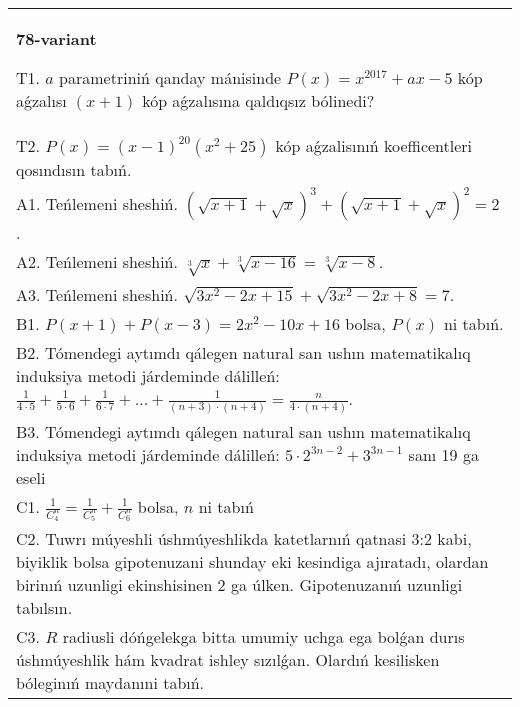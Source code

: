\documentclass{article}
\begin{document}
\begin{tabular}{m{17cm}}
\textbf{78-variant}
\newline

T1. \(a\) parametriniń qanday mánisinde \(P(x) = x^{2017} + ax - 5\) kóp aǵzalısı \((x + 1)\) kóp aǵzalısına qaldıqsız bólinedi? \\
T2. \(P(x) = (x - 1)^{20}\left( x^{2} + 25 \right)\) kóp aǵzalisınıń koefficentleri qosındısın tabıń. \\
A1. Teńlemeni sheshiń. \((\sqrt{x + 1} + \sqrt{x})^{3} + (\sqrt{x + 1} + \sqrt{x})^{2} = 2\). \\
A2. Teńlemeni sheshiń. \(\sqrt[3]{x} + \sqrt[3]{x - 16} = \sqrt[3]{x - 8}\). \\
A3. Teńlemeni sheshiń. \(\sqrt{3x^{2} - 2x + 15} + \sqrt{3x^{2} - 2x + 8} = 7\). \\
B1. \(P(x + 1) + P(x - 3) = 2x^{2} - 10x + 16\) bolsa, \(P(x)\) ni tabıń. \\
B2. Tómendegi aytımdı qálegen natural san ushın matematikalıq induksiya metodi járdeminde dálilleń: \(\frac{1}{4 \cdot 5} + \frac{1}{5 \cdot 6} + \frac{1}{6 \cdot 7} + \ldots + \frac{1}{(n + 3) \cdot (n + 4)} = \frac{n}{4 \cdot (n + 4)}\). \\
B3. Tómendegi aytımdı qálegen natural san ushın matematikalıq induksiya metodi járdeminde dálilleń: \(5 \cdot 2^{3n - 2} + 3^{3n - 1}\) sanı 19 ga eseli \\
C1. \(\frac{1}{C_{4}^{n}} = \frac{1}{C_{5}^{n}} + \frac{1}{C_{6}^{n}}\) bolsa, \(n\) ni tabıń \\
C2. Tuwrı múyeshli úshmúyeshlikda katetlarnıń qatnasi 3:2 kabi, biyiklik bolsa gipotenuzani shunday eki kesindiga ajıratadı, olardan birinıń uzunligi ekinshisinen 2 ga úlken. Gipotenuzanıń uzunligi tabılsın. \\
C3. \(R\) radiusli dóńgelekga bitta umumiy uchga ega bolǵan durıs úshmúyeshlik hám kvadrat ishley sızılǵan. Olardıń kesilisken bóleginıń maydanıni tabıń. \\

\end{tabular}
\vspace{1cm}
\end{document}
